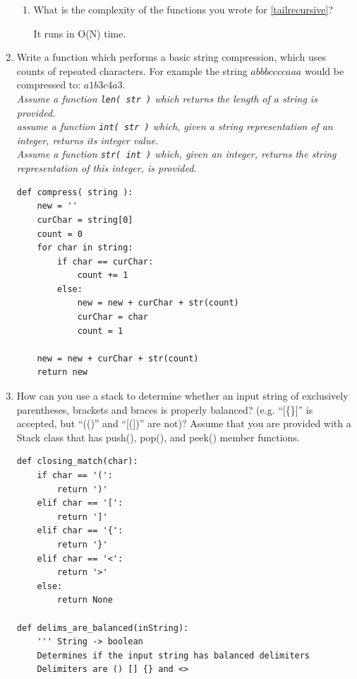 \documentclass[11pt]{article}
\newenvironment{answer}{\large\lstset{basicstyle=\tiny}\color{white}}{}
\newenvironment{answer}{\large\lstset{basicstyle=\large}\color{red}}{}
\begin{document}
\begin{enumerate}
\begin{enumerate}
\item
What is the complexity of the functions you wrote for \ref{tailrecursive}?
\begin{answer}

It runs in O(N) time. \\
\end{answer}
\end{enumerate}

\item Write a function which performs a basic string compression, which uses counts of repeated characters. For example 
the string $abbbccccaaa$ would be compressed to: $a1b3c4a3$. \\
 \emph{Assume a function \texttt{len( str )} which returns the length of a string is provided. \\
      assume a function \texttt{int( str )} which, given a string representation of an integer, returns its integer value. \\
      Assume a function \texttt{str( int )} which, given an integer, returns the string representation of this integer, is provided. }

\begin{answer}
\begin{lstlisting}
def compress( string ):
    new = ''
    curChar = string[0]
    count = 0
    for char in string:
        if char == curChar:
            count += 1
        else:
            new = new + curChar + str(count)
            curChar = char
            count = 1 

    new = new + curChar + str(count)
    return new
\end{lstlisting}
\end{answer}

\newpage
\item How can you use a stack to determine whether an input string of exclusively
      parentheses, brackets and braces is properly balanced? (e.g. ``[\{\}]'' is accepted, but
      ``(()'' and ``[(])'' are not)?
      Assume that you are provided with a Stack class that has push(), pop(), and peek() member functions.

    \begin{answer}
    \begin{lstlisting} 
def closing_match(char):
	if char == '(':
		return ')'
	elif char == '[':
		return ']'
	elif char == '{':
		return '}'
	elif char == '<':
		return '>'
	else:
		return None

def delims_are_balanced(inString):
    ''' String -> boolean
    Determines if the input string has balanced delimiters
    Delimiters are () [] {} and <>  
    

\end{lstlisting}
\end{answer}
\end{enumerate}
\end{document}
